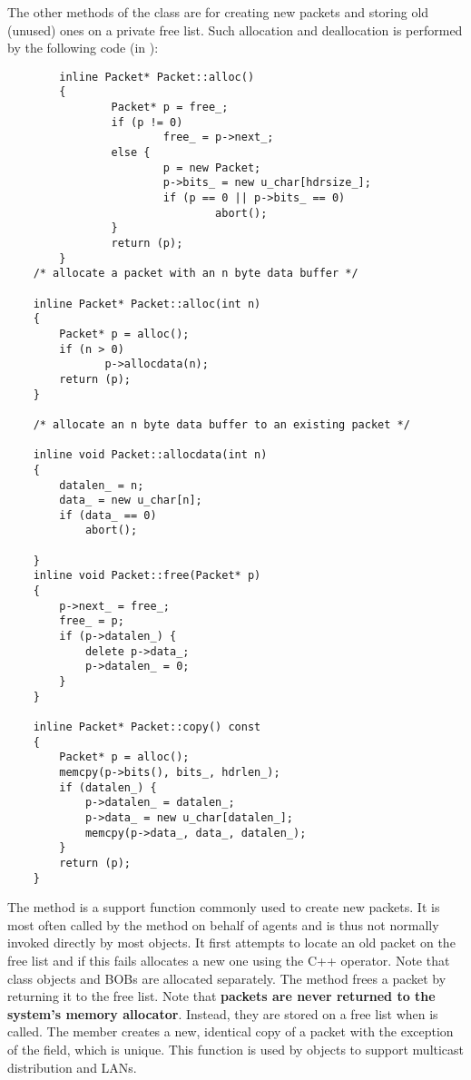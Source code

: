 The other methods of the  class are for creating new
packets and storing old (unused) ones on a private free list.
Such allocation and deallocation is performed by the
following code (in ):
\begin{small}
\begin{verbatim}
        inline Packet* Packet::alloc()
        {
                Packet* p = free_;
                if (p != 0)
                        free_ = p->next_;
                else {
                        p = new Packet;
                        p->bits_ = new u_char[hdrsize_];
                        if (p == 0 || p->bits_ == 0)
                                abort();
                }
                return (p);
        }
	/* allocate a packet with an n byte data buffer */

	inline Packet* Packet::alloc(int n)
	{
		Packet* p = alloc();
		if (n > 0)
		       p->allocdata(n);
		return (p);
	}
		
	/* allocate an n byte data buffer to an existing packet */
		
	inline void Packet::allocdata(int n)
	{       
		datalen_ = n; 
		data_ = new u_char[n];
		if (data_ == 0)
			abort();
	 
	}       
	inline void Packet::free(Packet* p)
	{
		p->next_ = free_;
		free_ = p;
		if (p->datalen_) {
			delete p->data_;
			p->datalen_ = 0;
		}
	}       
	 
	inline Packet* Packet::copy() const
	{               
		Packet* p = alloc();
		memcpy(p->bits(), bits_, hdrlen_);  
		if (datalen_) { 
			p->datalen_ = datalen_;
			p->data_ = new u_char[datalen_];
			memcpy(p->data_, data_, datalen_);
		}
		return (p);
	}

\end{verbatim}
\end{small}
The  method is a support function commonly
used to create new packets.
It is most often called by the  method on
behalf of agents and is thus not normally invoked directly by most objects.
It first attempts to locate an old packet on the free list and
if this fails allocates a new one using the C++  operator.
Note that  class objects and BOBs are
allocated separately.
The  method frees a packet by returning it to the free
list.
Note that {\bf packets are never returned to the system's memory
allocator}.
Instead, they are stored on a free list when  is called.
The  member creates a new, identical copy of a packet
with the exception of the  field, which is unique.
This function is used by  objects to support
multicast distribution and LANs.

